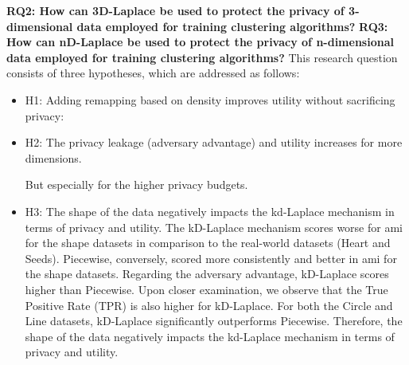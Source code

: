 \textbf{RQ2: How can 3D-Laplace be used to protect the privacy of 3-dimensional data employed for training clustering algorithms?} \newline
{}
\textbf{RQ3: How can nD-Laplace be used to protect the privacy of n-dimensional data employed for training clustering algorithms?} \newline
This research question consists of three hypotheses, which are addressed as follows: \newline
\begin{itemize}
      \item H1: Adding remapping based on density improves utility without sacrificing privacy:

      \item H2: The privacy leakage (adversary advantage) and utility increases for more dimensions.

            But especially for the higher privacy budgets.
      \item H3: The shape of the data negatively impacts the kd-Laplace mechanism in terms of privacy and utility.
            The kD-Laplace mechanism scores worse for \gls{ami} for the shape datasets in comparison to the real-world datasets (Heart and Seeds).
            Piecewise, conversely, scored more consistently and better in \gls{ami} for the shape datasets.
            Regarding the adversary advantage, kD-Laplace scores higher than Piecewise.
            Upon closer examination, we observe that the True Positive Rate (TPR) is also higher for kD-Laplace. For both the Circle and Line datasets,
            kD-Laplace significantly outperforms Piecewise.
            Therefore, the shape of the data negatively impacts the kd-Laplace mechanism in terms of privacy and utility.
\end{itemize}

